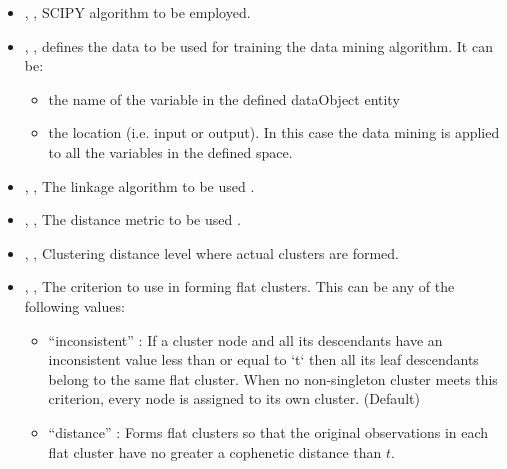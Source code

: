 \begin{itemize}
  \item {}, , SCIPY algorithm to be employed.
  \item {}, , defines the data to be used for training the data mining algorithm. It can be:
    \begin{itemize}
      \item the name of the variable in the defined dataObject entity
      \item the location (i.e. input or output). In this case the data mining is applied to all the variables in the defined space.
    \end{itemize}
  \item {},         , The linkage algorithm to be used  .
  \item {},         , The distance metric to be used .
  \item {},          ,  Clustering distance level where actual clusters are formed.
  \item {},      , The criterion to use in forming flat clusters. This can be any of the following values:
    \begin{itemize}
      \item   ``inconsistent''     : If a cluster node and all its descendants have an inconsistent value less than or equal to `t` then all its leaf descendants
                                     belong to the same flat cluster. When no non-singleton cluster meets this criterion, every node is assigned to its own
                                     cluster. (Default)
      \item   ``distance''         : Forms flat clusters so that the original observations in each flat cluster have no greater a cophenetic distance than $t$.

\end{itemize}
\end{itemize}
